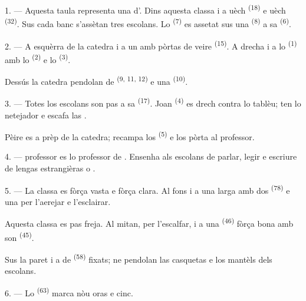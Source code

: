 \VUsaut{3.0mm}

1. --- Aquesta taula representa una  d'. Dins
aquesta classa i a uèch  \textsuperscript{(18)} e uèch
 \textsuperscript{(32)}. Sus cada banc s'assètan tres escolans. Lo
 \textsuperscript{(7)} es assetat sus una 
\textsuperscript{(8)} a sa  \textsuperscript{(6)}.

2. --- A esquèrra de la catedra i a un  amb pòrtas de veire
\textsuperscript{(15)}. A drecha i a lo 
\textsuperscript{(1)} amb lo  \textsuperscript{(2)} e lo
 \textsuperscript{(3)}.

Dessús la catedra pendolan de 
\textsuperscript{(9, 11, 12)} e una  \textsuperscript{(10)}.

3. --- Totes los escolans son pas a sa  \textsuperscript{(17)}. Joan
\textsuperscript{(4)} es drech contra lo tablèu; ten lo netejador e escafa las
.

Pèire es a prèp de la catedra; recampa los 
\textsuperscript{(5)} e los pòrta al professor.

4. ---  professor es lo professor de .
Ensenha als escolans de parlar, legir e escriure de lengas estrangièras
 o .

5. --- La classa es fòrça vasta e fòrça clara. Al fons i a una 
larga amb dos  \textsuperscript{(78)} e una  per l'aerejar e l'esclairar.

Aquesta classa es pas freja. Al mitan, per l'escalfar, i a una 
\textsuperscript{(46)} fòrça bona amb son  \textsuperscript{(45)}.

Sus la paret i a de  \textsuperscript{(58)} fixats; ne pendolan
las casquetas e los mantèls dels escolans.

\VUsaut{5.2mm}
\VUsaut{3.6mm}

6. --- Lo  \textsuperscript{(63)} marca nòu oras e cinc.

